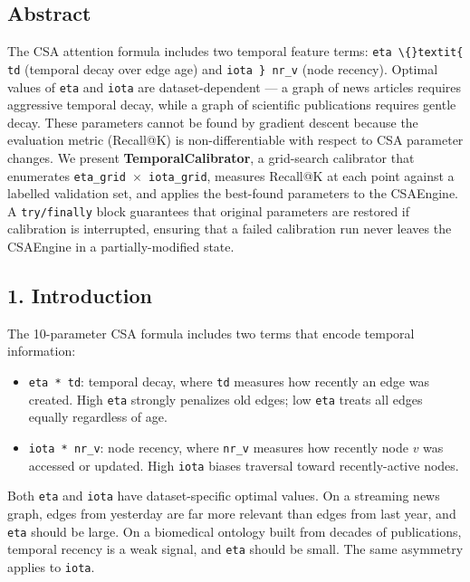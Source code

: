
\subsection*{Abstract}
The CSA attention formula includes two temporal feature terms: \texttt{eta \textbackslash\{\}textit\{ td} (temporal decay over edge age) and \texttt{iota \} nr\_v} (node recency). Optimal values of \texttt{eta} and \texttt{iota} are dataset-dependent --- a graph of news articles requires aggressive temporal decay, while a graph of scientific publications requires gentle decay. These parameters cannot be found by gradient descent because the evaluation metric (Recall@K) is non-differentiable with respect to CSA parameter changes. We present \textbf{TemporalCalibrator}, a grid-search calibrator that enumerates \texttt{eta\_grid $\times$ iota\_grid}, measures Recall@K at each point against a labelled validation set, and applies the best-found parameters to the CSAEngine. A \texttt{try/finally} block guarantees that original parameters are restored if calibration is interrupted, ensuring that a failed calibration run never leaves the CSAEngine in a partially-modified state.

\subsection*{1. Introduction}
The 10-parameter CSA formula \cite{vaswani2017attention} includes two terms that encode temporal information:

\begin{itemize}
  \item \texttt{eta * td}: temporal decay, where \texttt{td} measures how recently an edge was created. High \texttt{eta} strongly penalizes old edges; low \texttt{eta} treats all edges equally regardless of age.
  \item \texttt{iota * nr\_v}: node recency, where \texttt{nr\_v} measures how recently node $v$ was accessed or updated. High \texttt{iota} biases traversal toward recently-active nodes.
\end{itemize}


Both \texttt{eta} and \texttt{iota} have dataset-specific optimal values. On a streaming news graph, edges from yesterday are far more relevant than edges from last year, and \texttt{eta} should be large. On a biomedical ontology built from decades of publications, temporal recency is a weak signal, and \texttt{eta} should be small. The same asymmetry applies to \texttt{iota}.

